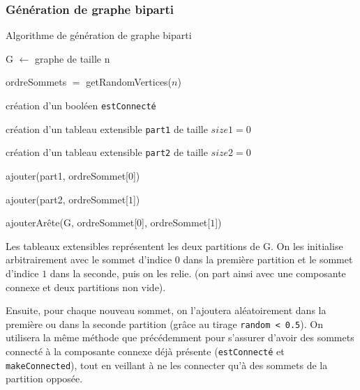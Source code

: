 \documentclass[a4paper,10pt]{article}
\begin{document}
\subsubsection{Génération de graphe biparti}

\begin{algorithm}[H]
\caption{Algorithme de génération de graphe biparti}
\BlankLine
G $\leftarrow$ graphe de taille n

ordreSommets $=$ getRandomVertices($n$)

création d'un booléen \texttt{estConnecté}

création d'un tableau extensible \texttt{part1} de taille $size1=0$

création d'un tableau extensible \texttt{part2} de taille $size2=0$

\bigskip
ajouter(part1, ordreSommet[$0$])

ajouter(part2, ordreSommet[$1$])

ajouterArête(G, ordreSommet[$0$], ordreSommet[$1$])



\end{algorithm}
\bigskip

Les tableaux extensibles représentent les deux partitions de G. On les initialise arbitrairement avec le sommet d'indice $0$ dans la première partition et le sommet d'indice $1$ dans la seconde, puis on les relie. (on part ainsi avec une composante connexe et deux partitions non vide).

Ensuite, pour chaque nouveau sommet, on l'ajoutera aléatoirement dans la première ou dans la seconde partition (grâce au tirage \texttt{random < 0.5}). On utilisera la même méthode que précédemment pour s'assurer d'avoir des sommets connecté à la composante connexe déjà présente (\texttt{estConnecté} et \texttt{makeConnected}), tout en veillant à ne les connecter qu'à des sommets de la partition opposée.
\end{document}
